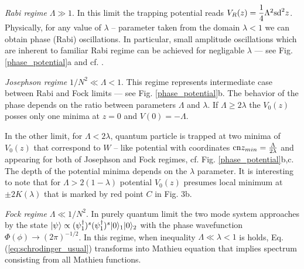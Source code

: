 \documentclass[aps, pre, preprint, groupedaddress, superscriptaddress, showkeys, showpacs] {revtex4-1}
\DeclarePairedDelimiter\ket{\lvert}{\rangle}
\begin{document}
\textit{Rabi regime} $\Lambda \gg 1$. In this limit the trapping potential reads $V_R(z) = \dfrac{1}{4} \Lambda^2 \textrm{sd}^2{z}$.
Physically, for any value of $\lambda$ -- parameter taken from the domain $\lambda <1$ we can obtain phase (Rabi) oscillations.
In particular, small amplitude oscillations which are inherent to familiar Rabi regime can be achieved for negligable $\lambda$ --- see Fig. \ref{phase_potential}a and cf. \cite{Anglin}.

\textit{Josephson regime} $1/N^2\ll\Lambda <1$.
This regime represents intermediate case between Rabi and Fock limits --- see Fig. \ref{phase_potential}b.
The behavior of the phase depends on the ratio between parameters $\Lambda$ and $\lambda$.
If $\Lambda \ge 2\lambda$ the $V_0(z)$ posses only one minima at $z = 0$ and $V(0) = -\Lambda$. 

In the other limit, for $\Lambda < 2 \lambda$, quantum particle is trapped at two minima of $V_0(z)$ that correspond to $W$ -- like potential with coordinates $\textrm{cn}{z_{min}} = \frac{\Lambda}{2 \lambda}$ and appearing for both of Josephson and Fock regimes, cf. Fig. \ref{phase_potential}b,c.  
The depth of the potential minima depends on the $\lambda$ parameter.
It is interesting to note that for $\Lambda > 2(1 - \lambda)$ potential $V_0(z)$ presumes local minimum at $\pm 2 K(\lambda)$ that is marked by red point $C$ in Fig. 3b.

\textit{Fock regime} $\Lambda \ll 1/N^2$.
In purely quantum limit the two mode system approaches by the state $\ket{\psi} \propto (\psi_1^\dag)^s (\psi_1^\dag)^s \ket{0}_1 \ket{0}_2$ with the phase wavefunction $\Phi(\phi) \to (2\pi)^{-1/2}$.
In this regime, when inequality $\Lambda \ll \lambda < 1$ is holds, Eq.(\ref{eq:schrodinger_usual}) transforms into Mathieu equation that implies spectrum consisting from all Mathieu functions.
%

%
%
%
%
\end{document}
